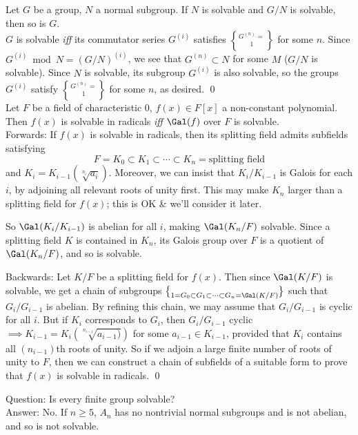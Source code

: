 \thm Let $G$ be a group, $N$ a normal subgroup.  If $N$ is solvable and $G/N$ is solvable, then so is $G$. \\
\pf $G$ is solvable \emph{iff} its commutator series $G^{(i)}$ satisfies $G^{(n)}=\brace1$ for some $n$.  Since $G^{(i)}\bmod N=(G/N)^{(i)}$, we see that $G^{(n)}\subset N$ for some $M$ ($G/N$ is solvable).  Since $N$ is solvable, its subgroup $G^{(i)}$ is also solvable, so the groups $G^{(i)}$ satisfy $G^{(n)}=\brace1$ for some $n$, as desired. \qed \\
\thm Let $F$ be a field of characteristic $0$, $f(x)\in F[x]$ a non-constant polynomial.  Then $f(x)$ is solvable in radicals \emph{iff} $\Gal(f)$ over $F$ is solvable. \\
\pf Forwards: If $f(x)$ is solvable in radicals, then its splitting field admits subfields satisfying
\[ F = K_0 \subset K_1 \subset \dotsb \subset K_n = \text{splitting field} \]
and $K_i=K_{i-1}(\sqrt[n_i]{a_i})$.  Moreover, we can insist that $K_i/K_{i-1}$ is Galois for each $i$, by adjoining all relevant roots of unity first.  This may make $K_n$ larger than a splitting field for $f(x)$; this is OK \& we'll consider it later.

So $\Gal(K_i/K_{i-1})$ is abelian for all $i$, making $\Gal(K_n/F)$ solvable.  Since a splitting field $K$ is contained in $K_n$, its Galois group over $F$ is a quotient of $\Gal(K_n/F)$, and so is solvable.

Backwards: Let $K/F$ be a splitting field for $f(x)$.  Then since $\Gal(K/F)$ is solvable, we get a chain of subgroups $\brace1=G_0\subset G_1\subset\dotsb\subset G_n=\Gal(K/F)$ such that $G_i/G_{i-1}$ is abelian.  By refining this chain, we may assume that $G_i/G_{i-1}$ is cyclic for all $i$.  But if $K_i$ corresponds to $G_i$, then $G_i/G_{i-1}$ cyclic $\implies K_{i-1}=K_i(\sqrt[n_{i-1}]{a_{i-1})})$ for some $a_{i-1}\in K_{i-1}$, provided that $K_i$ contains all $(n_{i-1})$th roots of unity.  So if we adjoin a large finite number of roots of unity to $F$, then we can construct a chain of subfields of a suitable form to prove that $f(x)$ is solvable in radicals. \qed

Question: Is every finite group solvable? \\
Answer: No.  If $n\geq5$, $A_n$ has no nontrivial normal subgroups and is not abelian, and so is not solvable.

